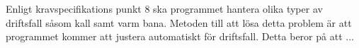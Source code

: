 Enligt kravspecifikations punkt 8 ska programmet hantera olika typer av driftsfall såsom kall samt varm bana.
Metoden till att lösa detta problem är att programmet kommer att justera automatiskt för driftsfall. Detta beror på att ...